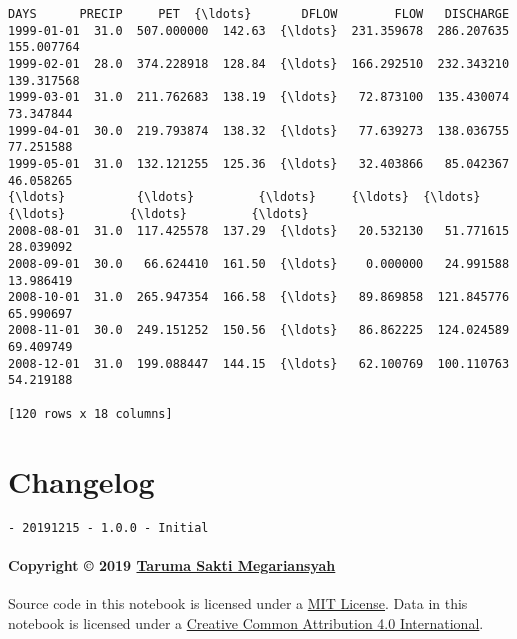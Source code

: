 \documentclass[11pt]{article}
\makeatletter
\newcommand{\boxspacing}{\kern\kvtcb@left@rule\kern\kvtcb@boxsep}
\newcommand{\prompt}[4]{
        {\ttfamily\llap{{\color{#2}[#3]:\hspace{3pt}#4}}\vspace{-\baselineskip}}
    }
\makeatother
\begin{document}
            \begin{tcolorbox}[breakable, size=fbox, boxrule=.5pt, pad at break*=1mm, opacityfill=0]
\prompt{Out}{outcolor}{ }{\boxspacing}
\begin{Verbatim}[commandchars=\\\{\}]
            DAYS      PRECIP     PET  {\ldots}       DFLOW        FLOW   DISCHARGE
1999-01-01  31.0  507.000000  142.63  {\ldots}  231.359678  286.207635  155.007764
1999-02-01  28.0  374.228918  128.84  {\ldots}  166.292510  232.343210  139.317568
1999-03-01  31.0  211.762683  138.19  {\ldots}   72.873100  135.430074   73.347844
1999-04-01  30.0  219.793874  138.32  {\ldots}   77.639273  138.036755   77.251588
1999-05-01  31.0  132.121255  125.36  {\ldots}   32.403866   85.042367   46.058265
{\ldots}          {\ldots}         {\ldots}     {\ldots}  {\ldots}         {\ldots}         {\ldots}         {\ldots}
2008-08-01  31.0  117.425578  137.29  {\ldots}   20.532130   51.771615   28.039092
2008-09-01  30.0   66.624410  161.50  {\ldots}    0.000000   24.991588   13.986419
2008-10-01  31.0  265.947354  166.58  {\ldots}   89.869858  121.845776   65.990697
2008-11-01  30.0  249.151252  150.56  {\ldots}   86.862225  124.024589   69.409749
2008-12-01  31.0  199.088447  144.15  {\ldots}   62.100769  100.110763   54.219188

[120 rows x 18 columns]
\end{Verbatim}
\end{tcolorbox}
        
    \hypertarget{changelog}{%
\section{Changelog}\label{changelog}}

\begin{verbatim}
- 20191215 - 1.0.0 - Initial
\end{verbatim}

\hypertarget{copyright-2019-taruma-sakti-megariansyah}{%
\paragraph{\texorpdfstring{Copyright © 2019
\href{https://taruma.github.io}{Taruma Sakti
Megariansyah}}{Copyright © 2019 Taruma Sakti Megariansyah}}\label{copyright-2019-taruma-sakti-megariansyah}}

Source code in this notebook is licensed under a
\href{https://choosealicense.com/licenses/mit/}{MIT License}. Data in
this notebook is licensed under a
\href{https://creativecommons.org/licenses/by/4.0/}{Creative Common
Attribution 4.0 International}.


    
    
    
\end{document}

